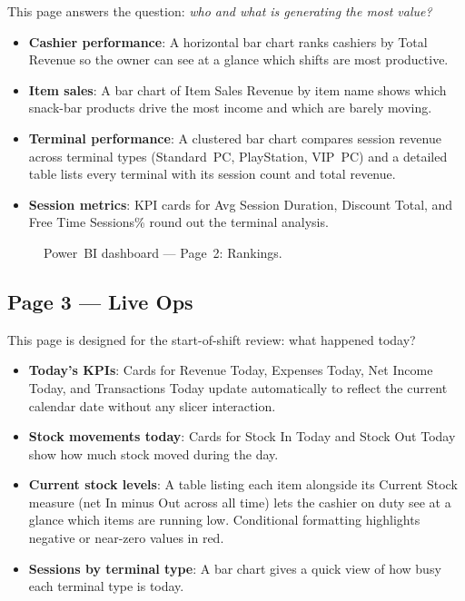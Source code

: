 This page answers the question: \textit{who and what is generating the most value?}

\begin{itemize}
  \item \textbf{Cashier performance}: A horizontal bar chart ranks cashiers by
        Total Revenue so the owner can see at a glance which shifts are most
        productive.
  \item \textbf{Item sales}: A bar chart of Item Sales Revenue by item name shows
        which snack-bar products drive the most income and which are barely moving.
  \item \textbf{Terminal performance}: A clustered bar chart compares session revenue
        across terminal types (Standard~PC, PlayStation, VIP~PC) and a detailed
        table lists every terminal with its session count and total revenue.
  \item \textbf{Session metrics}: KPI cards for Avg Session Duration, Discount Total,
        and Free Time Sessions\% round out the terminal analysis.
\end{itemize}

\begin{figure}[H]
  \centering
  \caption{Power~BI dashboard --- Page~2: Rankings.}
  \label{fig:pbi_page2}
\end{figure}

\subsection{Page 3 — Live Ops}

This page is designed for the start-of-shift review: what happened today?

\begin{itemize}
  \item \textbf{Today's KPIs}: Cards for Revenue Today, Expenses Today, Net Income
        Today, and Transactions Today update automatically to reflect the current
        calendar date without any slicer interaction.
  \item \textbf{Stock movements today}: Cards for Stock In Today and Stock Out
        Today show how much stock moved during the day.
  \item \textbf{Current stock levels}: A table listing each item alongside its
        Current Stock measure (net In minus Out across all time) lets the cashier
        on duty see at a glance which items are running low. Conditional formatting
        highlights negative or near-zero values in red.
  \item \textbf{Sessions by terminal type}: A bar chart gives a quick view of how
        busy each terminal type is today.
\end{itemize}

